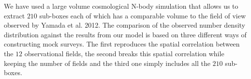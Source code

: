 \documentclass{emulateapj}
\begin{document}
We have used a large volume cosmological N-body simulation that allows
us to extract $210$ sub-boxes each of which has a comparable
volume to the field of view observed by Yamada et al. 2012. The
comparison of the observed number density distribution against the
results from our model is based on three different ways of
constructing mock surveys. The first reproduces the spatial
correlation between the $12$ observational fields, the second breaks
this spatial correlation while keeping the number of fields and the
third one simply includes all the $210$ sub-boxes.
\end{document}
